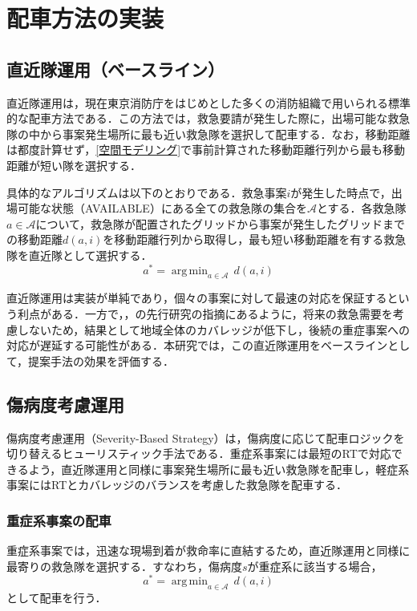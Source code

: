 \section{配車方法の実装}
\subsection{直近隊運用（ベースライン）}

直近隊運用は，現在東京消防庁をはじめとした多くの消防組織で用いられる標準的な配車方法である．この方法では，救急要請が発生した際に，出場可能な救急隊の中から事案発生場所に最も近い救急隊を選択して配車する．なお，移動距離は都度計算せず，\ref{空間モデリング}で事前計算された移動距離行列から最も移動距離が短い隊を選択する．

具体的なアルゴリズムは以下のとおりである．救急事案$i$が発生した時点で，出場可能な状態（AVAILABLE）にある全ての救急隊の集合を$\mathcal{A}$とする．各救急隊$a \in \mathcal{A}$について，救急隊が配置されたグリッドから事案が発生したグリッドまでの移動距離$d(a, i)$を移動距離行列から取得し，最も短い移動距離を有する救急隊を直近隊として選択する．
\[
  a^* = \mathop{\mathrm{arg\,min}}_{a \in \mathcal{A}} \, d(a, i)
\]

直近隊運用は実装が単純であり，個々の事案に対して最速の対応を保証するという利点がある．一方で，\cite{Carter1972}，\cite{Jagtenberg2017}の先行研究の指摘にあるように，将来の救急需要を考慮しないため，結果として地域全体のカバレッジが低下し，後続の重症事案への対応が遅延する可能性がある．本研究では，この直近隊運用をベースラインとして，提案手法の効果を評価する．


\subsection{傷病度考慮運用}
\label{傷病度考慮運用}
傷病度考慮運用（Severity-Based Strategy）は，傷病度に応じて配車ロジックを切り替えるヒューリスティック手法である．重症系事案には最短のRTで対応できるよう，直近隊運用と同様に事案発生場所に最も近い救急隊を配車し，軽症系事案にはRTとカバレッジのバランスを考慮した救急隊を配車する．

\subsubsection{重症系事案の配車}
重症系事案では，迅速な現場到着が救命率に直結するため，直近隊運用と同様に最寄りの救急隊を選択する．すなわち，傷病度$s$が重症系に該当する場合，
\[
  a^* = \mathop{\mathrm{arg\,min}}_{a \in \mathcal{A}} \, d(a, i)
\]
として配車を行う．

